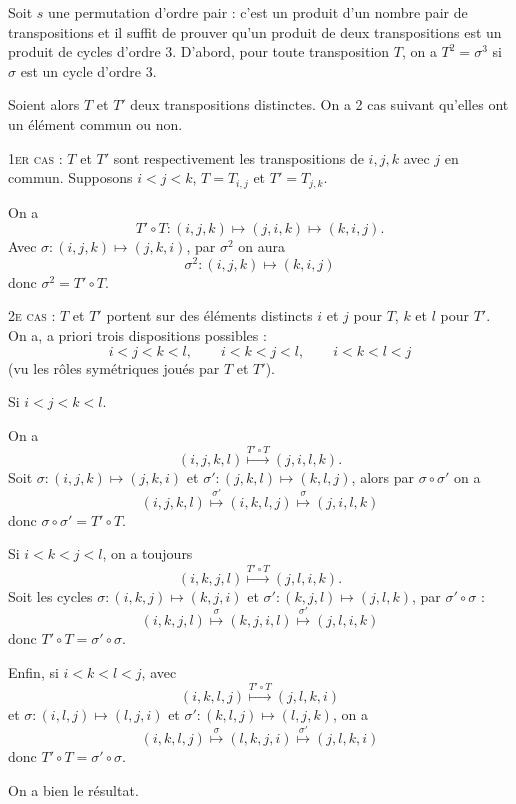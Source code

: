 \begin{enumerate}[label=\arabic*.,leftmargin=2.2em,itemsep=1.2em]
Soit $s$ une permutation d'ordre pair : c'est un produit d'un nombre pair de transpositions et il suffit de prouver qu'un produit de deux transpositions est un produit de cycles d'ordre 3. D'abord, pour toute transposition $T$, on a $T^2=\sigma^3$ si $\sigma$ est un cycle d'ordre 3.

Soient alors $T$ et $T'$ deux transpositions distinctes. On a 2 cas suivant qu'elles ont un élément commun ou non.

\textsc{1er cas} : $T$ et $T'$ sont respectivement les transpositions de $i,j,k$ avec $j$ en commun. Supposons $i<j<k$, $T=T_{i,j}$ et $T'=T_{j,k}$.

On a
\[
T'\circ T:(i,j,k)\longmapsto(j,i,k)\longmapsto(k,i,j).
\]
Avec $\sigma:(i,j,k)\longmapsto(j,k,i)$, par $\sigma^2$ on aura
\[
\sigma^2:(i,j,k)\longmapsto(k,i,j)
\]
donc $\sigma^2=T'\circ T$.

\textsc{2e cas} : $T$ et $T'$ portent sur des éléments distincts $i$ et $j$ pour $T$, $k$ et $l$ pour $T'$. On a, a priori trois dispositions possibles :
\[
i<j<k<l,\qquad i<k<j<l,\qquad i<k<l<j
\]
(vu les rôles symétriques joués par $T$ et $T'$).

Si $i<j<k<l$.

On a
\[
(i,j,k,l)\mathrel{\mathop{\longmapsto}\limits^{T'\circ T}}(j,i,l,k).
\]
Soit $\sigma:(i,j,k)\longmapsto(j,k,i)$ et $\sigma':(j,k,l)\longmapsto(k,l,j)$, alors par $\sigma\circ\sigma'$ on a
\[
(i,j,k,l)\mathrel{\mathop{\longmapsto}\limits^{\sigma'}}(i,k,l,j)
\mathrel{\mathop{\longmapsto}\limits^{\sigma}}(j,i,l,k)
\]
donc $\sigma\circ\sigma'=T'\circ T$.

Si $i<k<j<l$, on a toujours
\[
(i,k,j,l)\mathrel{\mathop{\longmapsto}\limits^{T'\circ T}}(j,l,i,k).
\]
Soit les cycles $\sigma:(i,k,j)\longmapsto(k,j,i)$ et $\sigma':(k,j,l)\longmapsto(j,l,k)$, par $\sigma'\circ\sigma$ :
\[
(i,k,j,l)\mathrel{\mathop{\longmapsto}\limits^{\sigma}}(k,j,i,l)
\mathrel{\mathop{\longmapsto}\limits^{\sigma'}}(j,l,i,k)
\]
donc $T'\circ T=\sigma'\circ\sigma$.

Enfin, si $i<k<l<j$, avec
\[
(i,k,l,j)\mathrel{\mathop{\longmapsto}\limits^{T'\circ T}}(j,l,k,i)
\]
et $\sigma:(i,l,j)\longmapsto(l,j,i)$ et $\sigma':(k,l,j)\longmapsto(l,j,k)$, on a
\[
(i,k,l,j)\mathrel{\mathop{\longmapsto}\limits^{\sigma}}(l,k,j,i)
\mathrel{\mathop{\longmapsto}\limits^{\sigma'}}(j,l,k,i)
\]
donc $T'\circ T=\sigma'\circ\sigma$.

On a bien le résultat.
\end{enumerate}
